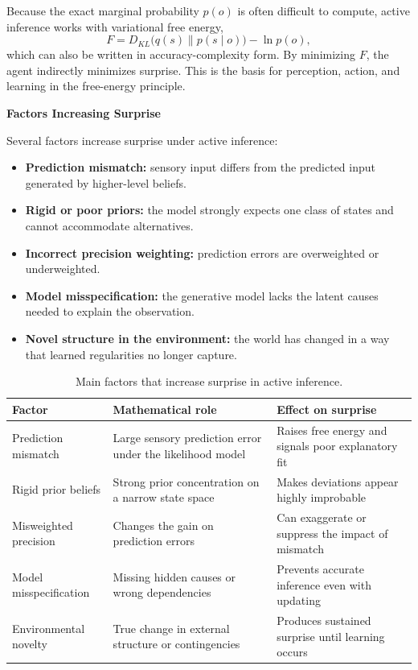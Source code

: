 \documentclass{book}
\providecommand{\ProjectDeepHeading}[2]{%
    \par\medskip\noindent\textbf{#2}\par\smallskip
}
\begin{document}
        Because the exact marginal probability $p(o)$ is often difficult to compute, active inference works with variational free energy,
        \begin{equation}
            F = D_{KL}\bigl(q(s) \parallel p(s \mid o)\bigr) - \ln p(o),
        \end{equation}
        which can also be written in accuracy-complexity form. By minimizing $F$, the agent indirectly minimizes surprise. This is the basis for perception, action, and learning in the free-energy principle.
    
    
    \ProjectDeepHeading{13}{Factors Increasing Surprise}
        Several factors increase surprise under active inference:
        \begin{itemize}[leftmargin=1.8em]
	\item \textbf{Prediction mismatch:} sensory input differs from the predicted input generated by higher-level beliefs.
    \item \textbf{Rigid or poor priors:} the model strongly expects one class of states and cannot accommodate alternatives.
    \item \textbf{Incorrect precision weighting:} prediction errors are overweighted or underweighted.
    \item \textbf{Model misspecification:} the generative model lacks the latent causes needed to explain the observation.
    \item \textbf{Novel structure in the environment:} the world has changed in a way that learned regularities no longer capture.
        \end{itemize}
        
        \begin{table}[H]
            \centering
            \small
            \begin{tabularx}{\textwidth}{>{\raggedright\arraybackslash}p{3.2cm} >{\raggedright\arraybackslash}X >{\raggedright\arraybackslash}X}
		\toprule
        \rowcolor{gray!15}
        \textbf{Factor} & \textbf{Mathematical role} & \textbf{Effect on surprise} \\
        \midrule
        Prediction mismatch & Large sensory prediction error under the likelihood model & Raises free energy and signals poor explanatory fit \\
        Rigid prior beliefs & Strong prior concentration on a narrow state space & Makes deviations appear highly improbable \\
        Misweighted precision & Changes the gain on prediction errors & Can exaggerate or suppress the impact of mismatch \\
        Model misspecification & Missing hidden causes or wrong dependencies & Prevents accurate inference even with updating \\
        Environmental novelty & True change in external structure or contingencies & Produces sustained surprise until learning occurs \\
        \bottomrule
            \end{tabularx}
            \caption{Main factors that increase surprise in active inference.}
        \end{table}
    
\end{document}
